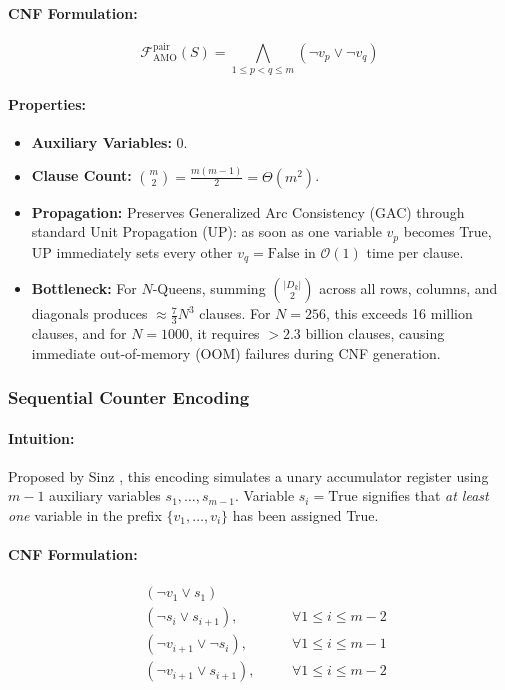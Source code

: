 \documentclass[a4paper,fleqn]{cas-sc}
\begin{document}
\paragraph{CNF Formulation:}
\begin{equation}
    \mathcal{F}_{\text{AMO}}^{\text{pair}}(S) = \bigwedge_{1 \le p < q \le m} (\neg v_p \vee \neg v_q) \label{eq:amo_pairwise}
\end{equation}
\paragraph{Properties:}
\begin{itemize}
    \item \textbf{Auxiliary Variables:} $0$.
    \item \textbf{Clause Count:} $\binom{m}{2} = \frac{m(m-1)}{2} = \Theta(m^2)$.
    \item \textbf{Propagation:} Preserves Generalized Arc Consistency (GAC) through standard Unit Propagation (UP): as soon as one variable $v_p$ becomes True, UP immediately sets every other $v_q = \text{False}$ in $\mathcal{O}(1)$ time per clause.
    \item \textbf{Bottleneck:} For $N$-Queens, summing $\binom{|D_k|}{2}$ across all rows, columns, and diagonals produces $\approx \frac{7}{3} N^3$ clauses. For $N = 256$, this exceeds 16 million clauses, and for $N = 1000$, it requires $>2.3$ billion clauses, causing immediate out-of-memory (OOM) failures during CNF generation.
\end{itemize}

\subsubsection{Sequential Counter Encoding}
\paragraph{Intuition:} Proposed by Sinz \cite{sinz2005towards}, this encoding simulates a unary accumulator register using $m - 1$ auxiliary variables $s_1, \dots, s_{m-1}$. Variable $s_i = \text{True}$ signifies that \textit{at least one} variable in the prefix $\{v_1, \dots, v_i\}$ has been assigned True.
\paragraph{CNF Formulation:}
\begin{align}
    & (\neg v_1 \vee s_1) \label{eq:seq_init} \\
    & (\neg s_i \vee s_{i+1}), \quad && \forall 1 \le i \le m-2 \label{eq:seq_shift} \\
    & (\neg v_{i+1} \vee \neg s_i), \quad && \forall 1 \le i \le m-1 \label{eq:seq_conflict} \\
    & (\neg v_{i+1} \vee s_{i+1}), \quad && \forall 1 \le i \le m-2 \label{eq:seq_update}
\end{align}
\end{document}

